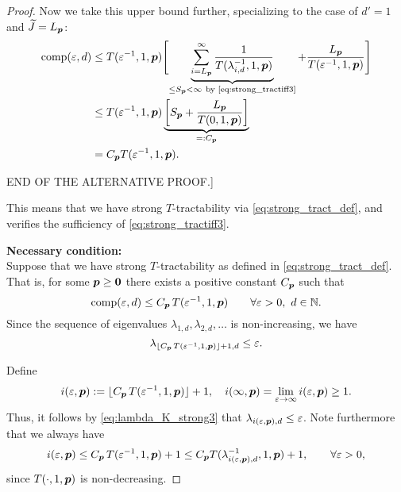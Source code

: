 \documentclass[11pt,a4paper]{article}
\begin{document}
\begin{proof}
{Now we take this upper bound further, specializing to the case of $d'=1$ and $\widetilde{J}=L_{\boldsymbol{p}}$:
\begin{align*}
       \operatorname{comp}(\varepsilon,d)
       & \le T(\varepsilon^{-1},1, \boldsymbol{p}) \Biggl [ \underbrace{\sum_{i=L_{\boldsymbol{p}}}^\infty \frac{1}{T(\lambda_{i, d}^{-1},1,\boldsymbol{p})}}_{\le S_{\boldsymbol{p}} <\infty\ \text{by \eqref{eq:strong_tractiff3}} }
       + \frac{L_{\boldsymbol{p}}}{T(\varepsilon^{-1},1, \boldsymbol{p})} \Biggr] \\
       & \le T(\varepsilon^{-1},1,\boldsymbol{p}) \underbrace{\left[S_{\boldsymbol{p}} + \frac{L_{\boldsymbol{p}}}{T(0,1, \boldsymbol{p})}\right]}_{=:C_{\boldsymbol{p}}}\\
       & =  C_{\boldsymbol{p}}T(\varepsilon^{-1},1,\boldsymbol{p}).
\end{align*}

\bigskip 

END OF THE ALTERNATIVE PROOF.]


}

This means that we have strong $T$-tractability via \eqref{eq:strong_tract_def}, and verifies the sufficiency of \eqref{eq:strong_tractiff3}.



\bigskip
\noindent \textbf{Necessary condition:} \\
Suppose that we have strong
$T$-tractability as defined in \eqref{eq:strong_tract_def}. That is, for some $\boldsymbol{p} \ge \boldsymbol{0}$ there exists a positive constant $C_{\boldsymbol{p}}$ such that
\[
\operatorname{comp}(\varepsilon,d)\le C_{\boldsymbol{p}}\, T(\varepsilon^{-1},1,\boldsymbol{p})
\qquad \forall \varepsilon > 0, \ d \in \mathbb{N}.
\]
Since the sequence of eigenvalues $\lambda_{1,d}, \lambda_{2,d}, \ldots $ is non-increasing, we have
\begin{equation}\label{eq:lambda_K_strong3}
\lambda_{\lfloor C_{\boldsymbol{p}}\, T(\varepsilon^{-1},1,\boldsymbol{p})\rfloor +1,d}\le \varepsilon.
\end{equation}

Define
\[
i(\varepsilon,\boldsymbol{p}):= \lfloor C_{\boldsymbol{p}}\, T(\varepsilon^{-1},1,\boldsymbol{p})\rfloor +1, \quad
i(\infty,\boldsymbol{p}) = \lim_{\varepsilon \to \infty}  i(\varepsilon,\boldsymbol{p}) \ge 1 .
\]
Thus, it follows by \eqref{eq:lambda_K_strong3} that $\lambda_{i(\varepsilon,\boldsymbol{p}),d} \le \varepsilon$.
Note furthermore that we always have
\[
i(\varepsilon,\boldsymbol{p})\le C_{\boldsymbol{p}}\, T(\varepsilon^{-1},1,\boldsymbol{p})+1 \le C_{\boldsymbol{p}} T(\lambda_{i(\varepsilon,\boldsymbol{p}),d}^{-1},1,\boldsymbol{p})+1, \qquad \forall \varepsilon > 0,
\]
since
$T(\cdot,1, \boldsymbol{p})$ is non-decreasing.


\end{proof}
\end{document}
